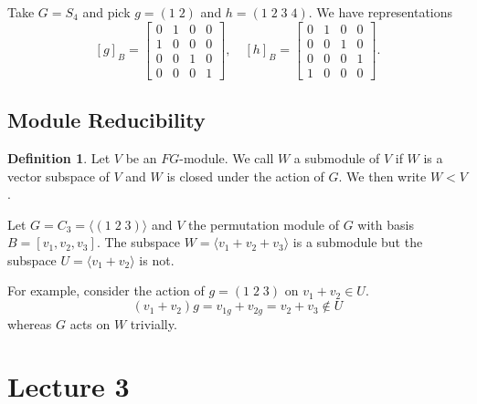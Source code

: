 \documentclass[11pt, notitlepage]{article}
\numberwithin{equation}{section}
\theoremstyle{plain}
\theoremstyle{definition}
\newtheorem{definition}[theorem]{Definition}
\newenvironment{example}
	{\pushQED{\qed}\renewcommand{\qedsymbol}{$\blacktriangleleft$}\examplex}
	{\popQED\endexamplex}
\begin{document}
\begin{example}
Take $G = S_4$ and pick $g = (1\;2)$ and $h = (1\;2\;3\;4)$. We have representations
\[
    [g]_B = \begin{bmatrix} 0&1&0&0\\ 1&0&0&0\\ 0&0&1&0\\ 0&0&0&1 \end{bmatrix}, \quad
    [h]_B = \begin{bmatrix} 0&1&0&0\\ 0&0&1&0\\ 0&0&0&1\\ 1&0&0&0 \end{bmatrix}.
\]
\end{example}


\subsection{Module Reducibility}



\begin{definition}
Let $V$ be an $FG$-module. We call $W$ a submodule of $V$ if $W$ is a vector subspace of $V$ and $W$ is closed under the action of $G$. We then write $W<V$.
\end{definition}

\begin{example}
Let $G=C_3=\langle (1\;2\;3)\rangle$ and $V$ the permutation module of $G$ with basis $B=[v_1,v_2,v_3]$. The subspace $W=\langle v_1 + v_2 + v_3 \rangle$ is a submodule but the subspace $U=\langle v_1 + v_2 \rangle$ is not.

For example, consider the action of $g = (1\;2\;3)$ on $v_1 + v_2 \in U$. 
\[
	(v_1 + v_2)g = v_{1g} + v_{2g} = v_2 + v_3 \not\in U
\]
whereas $G$ acts on $W$ trivially.
\end{example}



















\section{Lecture 3}
\end{document}
